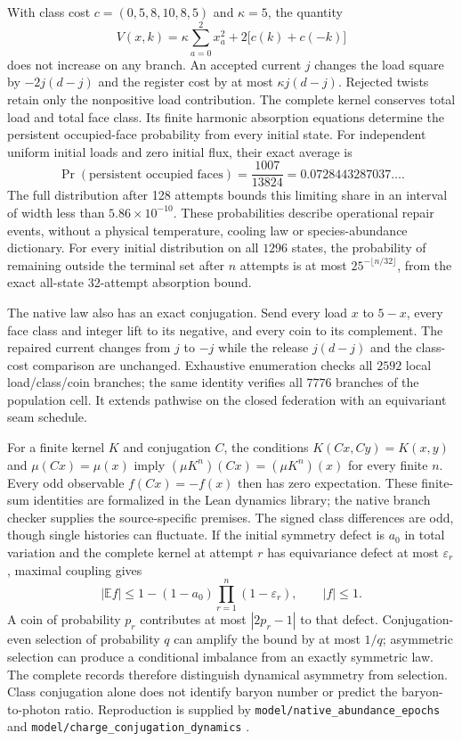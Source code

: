 With class cost $c=(0,5,8,10,8,5)$ and $\kappa=5$, the quantity
\[
 V(x,k)=\kappa\sum_{a=0}^{2}x_a^2+2\bigl[c(k)+c(-k)\bigr]
\]
does not increase on any branch. An accepted current $j$ changes the load
square by $-2j(d-j)$ and the register cost by at most $\kappa j(d-j)$.
Rejected twists retain only the nonpositive load contribution. The complete
kernel conserves total load and total face class. Its finite harmonic
absorption equations determine the persistent occupied-face probability
from every initial state. For independent uniform initial loads and zero
initial flux, their exact average is
\[
 \Pr(\text{persistent occupied faces})=\frac{1007}{13824}
       =0.0728443287037\ldots.
\]
The full distribution after 128 attempts bounds this limiting share in an interval of width less than
$5.86\times10^{-10}$. These probabilities describe operational repair events,
without a physical temperature, cooling law or species-abundance dictionary.
For every initial distribution on all $1296$ states, the probability of
remaining outside the terminal set after $n$ attempts is at most
$25^{-\lfloor n/32\rfloor}$, from the exact all-state 32-attempt
absorption bound.

The native law also has an exact conjugation. Send every load $x$ to $5-x$,
every face class and integer lift to its negative, and every coin to its
complement. The repaired current changes from $j$ to $-j$ while the release
$j(d-j)$ and the class-cost comparison are unchanged. Exhaustive enumeration
checks all $2592$ local load/class/coin branches; the same identity verifies
all $7776$ branches of the population cell. It extends pathwise on the closed
federation with an equivariant seam schedule.

For a finite kernel $K$ and conjugation $C$, the conditions
$K(Cx,Cy)=K(x,y)$ and $\mu(Cx)=\mu(x)$ imply
$(\mu K^n)(Cx)=(\mu K^n)(x)$ for every finite $n$.
Every odd observable $f(Cx)=-f(x)$ then has zero expectation. These finite-sum
identities are formalized in the Lean dynamics library; the native branch
checker supplies the source-specific premises. The signed class differences
are odd, though single histories can fluctuate. If the initial symmetry
defect is $a_0$ in total variation and the complete kernel at attempt $r$
has equivariance defect at most $\varepsilon_r$, maximal coupling gives
\[
 |\mathbb E f|\le
 1-(1-a_0)\prod_{r=1}^{n}(1-\varepsilon_r),\qquad |f|\le1.
\]
A coin of probability $p_r$ contributes at most $|2p_r-1|$ to that defect.
Conjugation-even selection of probability $q$ can amplify the bound by at
most $1/q$; asymmetric selection can produce a conditional imbalance from
an exactly symmetric law. The complete records therefore distinguish
dynamical asymmetry from selection. Class conjugation alone does not identify
baryon number or predict the baryon-to-photon ratio. Reproduction is supplied
by \texttt{model/native\_abundance\_epochs} and
\texttt{model/charge\_conjugation\_dynamics} \cite{ophrepo}.

